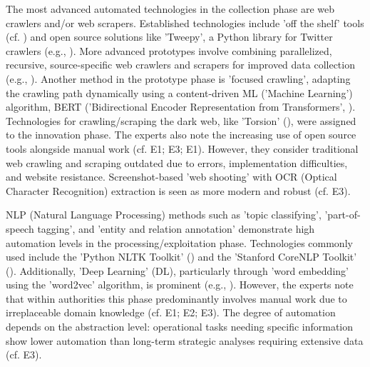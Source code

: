 \documentclass[10pt]{article}
\begin{document}
The most advanced automated technologies in the collection phase are web crawlers and/or web scrapers.
Established technologies include 'off the shelf' tools (cf. \cite{Middleton.2020}) and open source
solutions like 'Tweepy', a Python library for Twitter crawlers (e.g., \cite{Adewopo.2020}).
More advanced prototypes involve combining parallelized, recursive, source-specific web crawlers and scrapers for improved
data collection (e.g., \cite{Jenkins.2021}). Another method in the prototype phase is
'focused crawling', adapting the crawling path dynamically using a content-driven ML ('Machine Learning') algorithm, BERT ('Bidirectional Encoder Representation from Transformers',
\cite{Kuehn.2023}). Technologies for crawling/scraping the dark web, like 'Torsion' (\cite{Sonawane.2022}),
were assigned to the innovation phase. The experts also note the increasing use of open source tools alongside manual work
(cf. E1; E3; E1). However, they consider traditional web crawling and scraping
outdated due to errors, implementation difficulties, and website resistance. Screenshot-based 'web shooting' with
OCR (Optical Character Recognition) extraction is seen as more modern and robust (cf. E3).

NLP (Natural Language Processing) methods such as 'topic classifying', 'part-of-speech tagging', and 'entity and relation annotation'
demonstrate high automation levels in the processing/exploitation phase. Technologies commonly used include
the 'Python NLTK Toolkit' (\cite{Hubbard.2022}) and the 'Stanford CoreNLP Toolkit' (\cite{Middleton.2020}).
Additionally, 'Deep Learning' (DL), particularly through 'word embedding' using the 'word2vec' algorithm, is prominent
(e.g., \cite{Bai.2020}). However, the experts note that within authorities this phase predominantly involves manual work due to irreplaceable domain knowledge
(cf. E1; E2; E3). The degree of automation depends on the abstraction level:
operational tasks needing specific information show lower automation than long-term strategic analyses requiring
extensive data (cf. E3).
\end{document}
